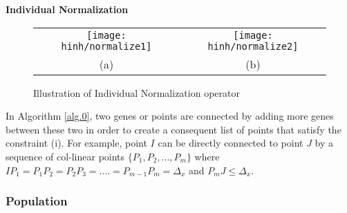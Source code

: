 \documentclass[final]{elsarticle}
\begin{document}
\begin{algorithm}[H]
	\SetAlgoLined
		\caption{\textbf{Individual Normalization}} 
		\label{alg.0}
\end{algorithm} 
\begin{figure*}[h]
	\begin{tabular}{cc}
		\texttt{[image: hinh/normalize1]}&\texttt{[image: hinh/normalize2]}\\
		(a) &(b)\\
	\end{tabular}
	\centering
	\caption{Illustration of Individual Normalization operator
	}
	\label{Fig.6}       %
\end{figure*}

In Algorithm \ref*{alg.0}, two genes or points are connected by adding more genes between these two in order to create a consequent list of points that satisfy the constraint (i). For example, point $ I $ can be directly connected to point $ J $ by a sequence of col-linear points $\{P_1,P_2,...,P_m\}$ where $IP_1=P_1P_2=P_2P_3=....=P_{m-1}P_m=\Delta_x$ and $P_mJ \leq \Delta_x$.\\

\subsubsection{Population}
\end{document}
